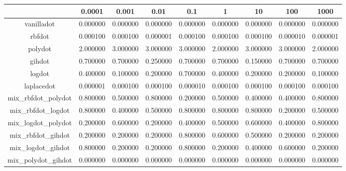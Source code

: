 \begin{table}[ht]
\centering
\begin{tabular}{ccccccccc}
  \hline
 & 0.0001 & 0.001 & 0.01 & 0.1 & 1 & 10 & 100 & 1000 \\ 
  \hline
vanilladot & 0.000000 & 0.000000 & 0.000000 & 0.000000 & 0.000000 & 0.000000 & 0.000000 & 0.000000 \\ 
  rbfdot & 0.000100 & 0.000100 & 0.000001 & 0.000100 & 0.000100 & 0.000100 & 0.000010 & 0.000001 \\ 
  polydot & 2.000000 & 3.000000 & 3.000000 & 3.000000 & 2.000000 & 3.000000 & 3.000000 & 2.000000 \\ 
  gihdot & 0.700000 & 0.700000 & 0.250000 & 0.700000 & 0.700000 & 0.150000 & 0.700000 & 0.700000 \\ 
  logdot & 0.400000 & 0.100000 & 0.200000 & 0.700000 & 0.400000 & 0.200000 & 0.200000 & 0.100000 \\ 
  laplacedot & 0.000001 & 0.000100 & 0.000100 & 0.000010 & 0.000100 & 0.000100 & 0.000100 & 0.000100 \\ 
  mix\_rbfdot\_polydot & 0.800000 & 0.500000 & 0.800000 & 0.200000 & 0.500000 & 0.400000 & 0.400000 & 0.800000 \\ 
  mix\_rbfdot\_logdot & 0.800000 & 0.400000 & 0.500000 & 0.800000 & 0.800000 & 0.800000 & 0.200000 & 0.500000 \\ 
  mix\_logdot\_polydot & 0.200000 & 0.600000 & 0.200000 & 0.400000 & 0.500000 & 0.600000 & 0.400000 & 0.800000 \\ 
  mix\_rbfdot\_gihdot & 0.200000 & 0.200000 & 0.200000 & 0.800000 & 0.600000 & 0.500000 & 0.200000 & 0.200000 \\ 
  mix\_logdot\_gihdot & 0.800000 & 0.200000 & 0.200000 & 0.800000 & 0.200000 & 0.400000 & 0.600000 & 0.200000 \\ 
  mix\_polydot\_gihdot & 0.000000 & 0.000000 & 0.000000 & 0.000000 & 0.000000 & 0.000000 & 0.000000 & 0.000000 \\ 
   \hline
\end{tabular}
\end{table}
